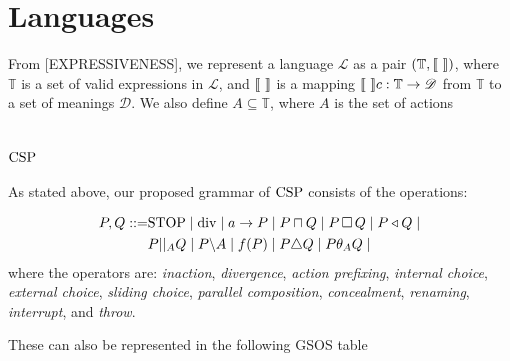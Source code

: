\section{Languages}\label{ssec:language}

From [EXPRESSIVENESS], we represent a language $\mathscr{L}$ as a pair $(\mathbb{T}, \llbracket \,\, \rrbracket)$, where $\mathbb{T}$ is a set of valid expressions in $\mathscr{L}$, and $\llbracket \,\, \rrbracket$ is a mapping $\llbracket \,\, \rrbracket c: \mathbb{T} \to \mathscr{D}$ from $\mathbb{T}$ to a set of meanings $\mathscr{D}$. We also define $A \subseteq \mathbb{T}$, where $A$ is the set of actions

\section{\texorpdfstring{$\mathrm{CSP}$}{CSP}}\label{ssec:CSP}
As stated above, our proposed grammar of $\mathrm{CSP}$ consists of the operations:

\begin{align*}
   P, Q ::= &\mathrm{STOP} \mid \mathrm{div} \mid a\to P \mid P \sqcap Q \mid P \,\square\, Q \mid P \triangleleft Q \mid \\
	&P | |_{A} Q \mid P \backslash A \mid f(P) \mid P \triangle Q \mid P \theta_{A} Q \mid 
\end{align*}
where the operators are: \textit{inaction}, \textit{divergence}, \textit{action prefixing}, \textit{internal choice}, \textit{external choice}, \textit{sliding choice}, \textit{parallel composition}, \textit{concealment}, \textit{renaming}, \textit{interrupt}, and \textit{throw}.

These can also be represented in the following GSOS table

